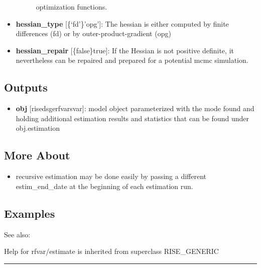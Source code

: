 \documentclass[letterpaper,10pt,english]{sphinxmanual}
\begin{document}
\begin{itemize}
\begin{description}
\begin{itemize}
\end{itemize}

optimization functions.

\end{description}

\item {} 
\textbf{hessian\_type} {[}\{`fd'\}\textbar{}'opg'{]}: The hessian is either computed by
finite differences (fd) or by outer-product-gradient (opg)

\item {} 
\textbf{hessian\_repair} {[}\{false\}\textbar{}true{]}: If the Hessian is not positive
definite, it nevertheless can be repaired and prepared for a potential
mcmc simulation.

\end{itemize}


\subsection{Outputs}
\label{classes/models/@rfvar/rfvar:id17}\begin{itemize}
\item {} 
\textbf{obj} {[}rise\textbar{}dsge\textbar{}rfvar\textbar{}svar{]}: model object parameterized with the
mode found and holding additional estimation results and statistics
that can be found under obj.estimation

\end{itemize}


\subsection{More About}
\label{classes/models/@rfvar/rfvar:id18}\begin{itemize}
\item {} 
recursive estimation may be done easily by passing a different
estim\_end\_date at the beginning of each estimation run.

\end{itemize}


\subsection{Examples}
\label{classes/models/@rfvar/rfvar:id19}
See also:

Help for rfvar/estimate is inherited from superclass RISE\_GENERIC


\bigskip\hrule{}\bigskip
\end{document}
